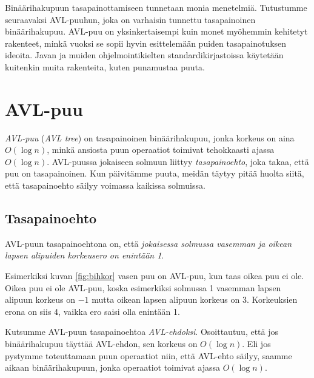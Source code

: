 Binäärihakupuun tasapainottamiseen tunnetaan monia menetelmiä.
Tutustumme seuraavaksi AVL-puuhun, joka on 
varhaisin tunnettu tasapainoinen binäärihakupuu.
AVL-puu on yksinkertaisempi kuin monet myöhemmin
kehitetyt rakenteet, minkä vuoksi se sopii hyvin esittelemään
puiden tasapainotuksen ideoita.
Javan ja muiden ohjelmointikielten standardikirjastoissa
käyte\-tään kuitenkin muita rakenteita, kuten punamustaa puuta.

\section{AVL-puu}


\emph{AVL-puu} (\emph{AVL tree}) on tasapainoinen binäärihakupuu, jonka
korkeus on aina $O(\log n)$, minkä ansiosta puun operaatiot
toimivat tehokkaasti ajassa $O(\log n)$.
AVL-puussa jokaiseen solmuun liittyy \emph{tasapainoehto},
joka takaa, että puu on tasapainoinen.
Kun päivitämme puuta, meidän täytyy pitää huolta siitä,
että tasapainoehto säilyy voimassa kaikissa solmuissa.

\subsection{Tasapainoehto}

AVL-puun tasapainoehtona on, että
\emph{jokaisessa solmussa vasemman ja oikean lapsen
alipuiden korkeusero on enintään 1}.

Esimerkiksi kuvan \ref{fig:bihkor} vasen puu on
AVL-puu, kun taas oikea puu ei ole.
Oikea puu ei ole AVL-puu, koska esimerkiksi solmussa 1
vasemman lapsen alipuun korkeus on $-1$ mutta oikean lapsen
alipuun korkeus on 3.
Korkeuksien erona on siis 4, vaikka ero saisi olla enintään 1.


Kutsumme AVL-puun tasapainoehtoa \emph{AVL-ehdoksi}.
Osoittautuu, että jos binäärihakupuu täyttää AVL-ehdon,
sen korkeus on $O(\log n)$.
Eli jos pystymme toteuttamaan puun operaatiot niin,
että AVL-ehto säilyy, saamme aikaan binäärihakupuun,
jonka operaatiot toimivat ajassa $O(\log n)$.

